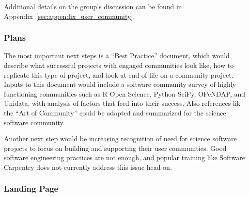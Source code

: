 Additional details on the group's discussion can be found in
Appendix~\ref{sec:appendix_user_community}.

\subsubsection{Plans}

The most important next steps is a ``Best Practice'' document, which would
describe what successful projects with engaged communities look like, how to
replicate this type of project, and look at end-of-life on a community project.
Inputs to this document would include a software community survey of highly
functioning communities such as R Open Science, Python SciPy, OPeNDAP, and
Unidata, with analysis of factors that feed into their success. Also references
lik the ``Art of Community'' could be adapted and summarized for the science
software community.

Another next step would be increasing recognition of need for science software
projects to focus on building and supporting their user communities. Good software
engineering practices are not enough, and popular training like Software
Carpentry does not currently address this issue head on.

\subsubsection{Landing Page}
